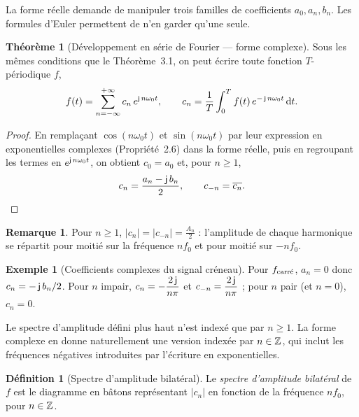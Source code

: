\documentclass[a4paper,11pt]{article}
\theoremstyle{definition}
\newtheorem{definition}{Définition}[section]
\newtheorem{theorem}{Théorème}[section]
\newtheorem{exemple}{Exemple}[section]
\newtheorem{remark}{Remarque}[section]
\newcommand{\highlight}[1]{{\color{niceblue}\emph{#1}}}
\begin{document}
La forme réelle demande de manipuler trois familles de coefficients $a_0, a_n, b_n$. Les formules d'Euler permettent de n'en garder qu'une seule.

\begin{theorem}[Développement en série de Fourier --- forme complexe]
    Sous les mêmes conditions que le Théorème~3.1, on peut écrire toute fonction $T$-périodique $f$,
    $$
        f(t) = \sum_{n=-\infty}^{+\infty} c_n\, e^{\operatorname{\mathsf{j}} n\omega_0 t}, \qquad c_n = \frac1T\int_0^T f(t)\,e^{-\operatorname{\mathsf{j}} n\omega_0 t}\,{\rm d} t.
    $$
\end{theorem}

\begin{proof}
    En remplaçant $\cos(n\omega_0 t)$ et $\sin(n\omega_0 t)$ par leur expression en exponentielles complexes (Propriété~2.6) dans la forme réelle, puis en regroupant les termes en $e^{\operatorname{\mathsf{j}} n\omega_0 t}$, on obtient $c_0 = a_0$ et, pour $n\geq1$,
    $$
        c_n = \frac{a_n - \operatorname{\mathsf{j}} b_n}{2}, \qquad c_{-n} = \overline{c_n}.
    $$
\end{proof}

\begin{remark}
    Pour $n\geq1$, $|c_n| = |c_{-n}| = \frac{A_n}{2}$ : l'amplitude de chaque harmonique se répartit pour moitié sur la fréquence $nf_0$ et pour moitié sur $-nf_0$.
\end{remark}

\begin{exemple}[Coefficients complexes du signal créneau]
    Pour $f_{\rm carr\acute{e}}$, $a_n=0$ donc $c_n = -\operatorname{\mathsf{j}} b_n/2$. Pour $n$ impair, $c_n = -\dfrac{2\operatorname{\mathsf{j}}}{n\pi}$ et $c_{-n} = \dfrac{2\operatorname{\mathsf{j}}}{n\pi}$ ; pour $n$ pair (et $n=0$), $c_n=0$.
\end{exemple}

Le spectre d'amplitude défini plus haut n'est indexé que par $n\geq1$. La forme complexe en donne naturellement une version indexée par $n\in{\mathbb{Z}}$, qui inclut les fréquences négatives introduites par l'écriture en exponentielles.

\begin{definition}[Spectre d'amplitude bilatéral]
    Le \highlight{spectre d'amplitude bilatéral} de $f$ est le diagramme en bâtons représentant $|c_n|$ en fonction de la fréquence $nf_0$, pour $n\in{\mathbb{Z}}$.
\end{definition}
\end{document}
